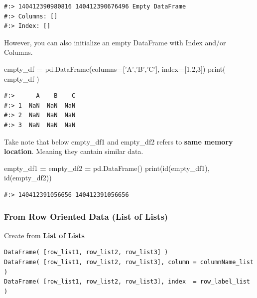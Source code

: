 \documentclass[
]{book}
\newenvironment{Shaded}{\begin{snugshade}}{\end{snugshade}}
\newcommand{\BuiltInTok}[1]{#1}
\newcommand{\DecValTok}[1]{\textcolor[rgb]{0.06,0.06,0.06}{#1}}
\newcommand{\NormalTok}[1]{#1}
\newcommand{\OperatorTok}[1]{\textcolor[rgb]{0.43,0.43,0.43}{\textbf{#1}}}
\newcommand{\StringTok}[1]{\textcolor[rgb]{0.5,0.5,0.5}{#1}}
\begin{document}
\begin{verbatim}
#:> 140412390980816 140412390676496 Empty DataFrame
#:> Columns: []
#:> Index: []
\end{verbatim}

However, you can also initialize an empty DataFrame with Index and/or Columns.

\begin{Shaded}
\begin{Highlighting}[]
\NormalTok{empty_df }\OperatorTok{=}\NormalTok{ pd.DataFrame(columns}\OperatorTok{=}\NormalTok{[}\StringTok{'A'}\NormalTok{,}\StringTok{'B'}\NormalTok{,}\StringTok{'C'}\NormalTok{], index}\OperatorTok{=}\NormalTok{[}\DecValTok{1}\NormalTok{,}\DecValTok{2}\NormalTok{,}\DecValTok{3}\NormalTok{])}
\BuiltInTok{print}\NormalTok{( empty_df )}
\end{Highlighting}
\end{Shaded}

\begin{verbatim}
#:>      A    B    C
#:> 1  NaN  NaN  NaN
#:> 2  NaN  NaN  NaN
#:> 3  NaN  NaN  NaN
\end{verbatim}

Take note that below empty\_df1 and empty\_df2 refers to \textbf{same memory location}. Meaning they cantain similar data.

\begin{Shaded}
\begin{Highlighting}[]
\NormalTok{empty_df1 }\OperatorTok{=}\NormalTok{ empty_df2 }\OperatorTok{=}\NormalTok{ pd.DataFrame()}
\BuiltInTok{print}\NormalTok{(}\BuiltInTok{id}\NormalTok{(empty_df1), }\BuiltInTok{id}\NormalTok{(empty_df2))}
\end{Highlighting}
\end{Shaded}

\begin{verbatim}
#:> 140412391056656 140412391056656
\end{verbatim}

\hypertarget{from-row-oriented-data-list-of-lists}{%
\subsubsection{From Row Oriented Data (List of Lists)}\label{from-row-oriented-data-list-of-lists}}

Create from \textbf{List of Lists}

\begin{verbatim}
DataFrame( [row_list1, row_list2, row_list3] )
DataFrame( [row_list1, row_list2, row_list3], column = columnName_list )
DataFrame( [row_list1, row_list2, row_list3], index  = row_label_list )
\end{verbatim}
\end{document}
